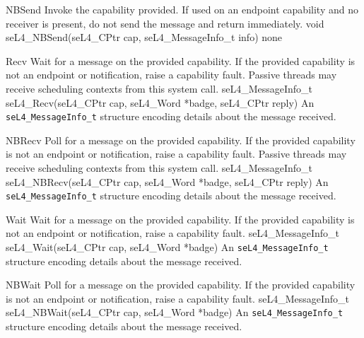 {NBSend}
{Invoke the capability provided. If used on an endpoint capability and no receiver is present, do
    not send the message and return immediately.}
{void seL4_NBSend(seL4_CPtr cap, seL4_MessageInfo_t info)}
{
}
{none}

{Recv}
{Wait for a message on the provided capability. If the provided capability is not an endpoint or
    notification, raise a capability fault. Passive threads may receive scheduling contexts from 
this system call.}
    {seL4_MessageInfo_t seL4_Recv(seL4_CPtr cap, seL4_Word *badge, seL4_CPtr reply)}
{
}
{An \texttt{seL4_MessageInfo_t} structure encoding details about the message received.}


{NBRecv}
{Poll for a message on the provided capability. If the provided capability is not an endpoint or
    notification, raise a capability fault. Passive threads may receive scheduling contexts from 
this system call.}
    {seL4_MessageInfo_t seL4_NBRecv(seL4_CPtr cap, seL4_Word *badge, seL4_CPtr reply)}
{
}
{An \texttt{seL4_MessageInfo_t} structure encoding details about the message received.}

{Wait}
{Wait for a message on the provided capability. If the provided capability is not an endpoint or
    notification, raise a capability fault.}
    {seL4_MessageInfo_t seL4_Wait(seL4_CPtr cap, seL4_Word *badge)}
{
}
{An \texttt{seL4_MessageInfo_t} structure encoding details about the message received.}

{NBWait}
{Poll for a message on the provided capability. If the provided capability is not an endpoint or
    notification, raise a capability fault.}
    {seL4_MessageInfo_t seL4_NBWait(seL4_CPtr cap, seL4_Word *badge)}
{
}
{An \texttt{seL4_MessageInfo_t} structure encoding details about the message received.}

